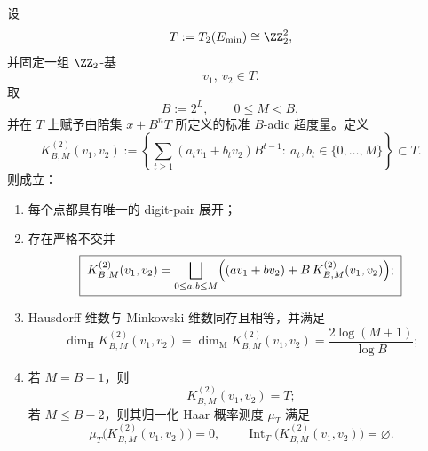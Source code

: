 \begin{theorem}\label{thm:conclusion-rank-two-tate-carpet}
设
\[
T:=T_2(E_{\min})\cong \ZZ_2^2,
\]
并固定一组 \(\ZZ_2\)-基
\[
v_1,\ v_2\in T.
\]
取
\[
B:=2^L,
\qquad
0\le M<B,
\]
并在 \(T\) 上赋予由陪集 \(x+B^nT\) 所定义的标准 \(B\)-adic 超度量。定义
\[
K_{B,M}^{(2)}(v_1,v_2)
:=
\left\{
\sum_{t\ge 1}(a_t v_1+b_t v_2)B^{t-1}:\ a_t,b_t\in\{0,\dots,M\}
\right\}\subset T.
\]
则成立：
\begin{enumerate}
  \item 每个点都具有唯一的 digit-pair 展开；
  \item 存在严格不交并
  \[
  \boxed{\;
  K_{B,M}^{(2)}(v_1,v_2)
  =
  \bigsqcup_{0\le a,b\le M}
  \Bigl((av_1+bv_2)+B\,K_{B,M}^{(2)}(v_1,v_2)\Bigr);\;}
  \]
  \item Hausdorff 维数与 Minkowski 维数同存且相等，并满足
  \[
  \boxed{\;
  \dim_{\mathrm H}K_{B,M}^{(2)}(v_1,v_2)
  =
  \dim_{\mathrm M}K_{B,M}^{(2)}(v_1,v_2)
  =
  \frac{2\log(M+1)}{\log B};\;}
  \]
  \item 若 \(M=B-1\)，则
  \[
  \boxed{\;
  K_{B,M}^{(2)}(v_1,v_2)=T;\;}
  \]
  若 \(M\le B-2\)，则其归一化 Haar 概率测度 \(\mu_T\) 满足
  \[
  \boxed{\;
  \mu_T\!\bigl(K_{B,M}^{(2)}(v_1,v_2)\bigr)=0,
  \qquad
  \operatorname{Int}_{T}\!\bigl(K_{B,M}^{(2)}(v_1,v_2)\bigr)=\varnothing.\;}
  \]
\end{enumerate}
\end{theorem}
